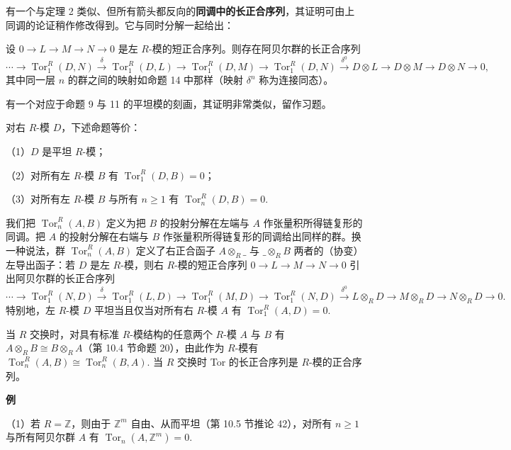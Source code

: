 有一个与定理 2 类似、但所有箭头都反向的\textbf{同调中的长正合序列}，其证明可由上同调的论证稍作修改得到。它与同时分解一起给出：

\begin{theorem}\label{thm:17.15}
设 \(0 \to L \to M \to N \to 0\) 是左 \(R\)-模的短正合序列。则存在阿贝尔群的长正合序列
\[
\cdots \to \operatorname{Tor}_1^R(D, N) \xrightarrow{\delta} \operatorname{Tor}_1^R(D, L) \to \operatorname{Tor}_1^R(D, M) \to \operatorname{Tor}_1^R(D, N) \xrightarrow{\delta^0} D \otimes L \to D \otimes M \to D \otimes N \to 0,
\]
其中同一层 \(n\) 的群之间的映射如命题 14 中那样（映射 \(\delta^n\) 称为连接同态）。
\end{theorem}

有一个对应于命题 9 与 11 的平坦模的刻画，其证明非常类似，留作习题。

\begin{proposition}\label{pro:17.16}
对右 \(R\)-模 \(D\)，下述命题等价：

（1）\(D\) 是平坦 \(R\)-模；

（2）对所有左 \(R\)-模 \(B\) 有 \(\operatorname{Tor}_1^R(D, B) = 0\)；

（3）对所有左 \(R\)-模 \(B\) 与所有 \(n \geq 1\) 有 \(\operatorname{Tor}_n^R(D, B) = 0\).
\end{proposition}

我们把 \(\operatorname{Tor}_n^R(A, B)\) 定义为把 \(B\) 的投射分解在左端与 \(A\) 作张量积所得链复形的同调。把 \(A\) 的投射分解在右端与 \(B\) 作张量积所得链复形的同调给出同样的群。换一种说法，群 \(\operatorname{Tor}_n^R(A, B)\) 定义了右正合函子 \(A \otimes_R \_\) 与 \(\_ \otimes_RB\) 两者的（协变）左导出函子：若 \(D\) 是左 \(R\)-模，则右 \(R\)-模的短正合序列 \(0 \to L \to M \to N \to 0\) 引出阿贝尔群的长正合序列
\[
\cdots \to \operatorname{Tor}_1^R(N, D) \xrightarrow{\delta} \operatorname{Tor}_1^R(L, D) \to \operatorname{Tor}_1^R(M, D) \to \operatorname{Tor}_1^R(N, D) \xrightarrow{\delta^0} L \otimes_RD \to M \otimes_RD \to N \otimes_RD \to 0.
\]
特别地，左 \(R\)-模 \(D\) 平坦当且仅当对所有右 \(R\)-模 \(A\) 有 \(\operatorname{Tor}_1^R(A, D) = 0\).

当 \(R\) 交换时，对具有标准 \(R\)-模结构的任意两个 \(R\)-模 \(A\) 与 \(B\) 有 \(A \otimes_RB \cong B \otimes_RA\)（第 10.4 节命题 20），由此作为 \(R\)-模有 \(\operatorname{Tor}_n^R(A, B) \cong \operatorname{Tor}_n^R(B, A)\). 当 \(R\) 交换时 Tor 的长正合序列是 \(R\)-模的正合序列。

\noindent\textbf{例}

（1）若 \(R = \mathbb{Z}\)，则由于 \(\mathbb{Z}^m\) 自由、从而平坦（第 10.5 节推论 42），对所有 \(n \geq 1\) 与所有阿贝尔群 \(A\) 有 \(\operatorname{Tor}_n(A, \mathbb{Z}^m) = 0\).

